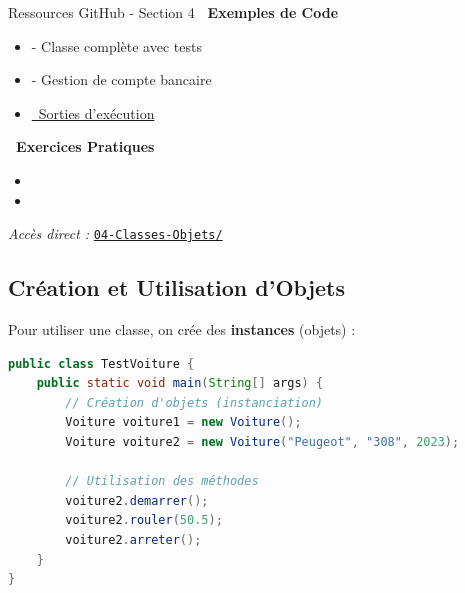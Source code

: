 \vspace{10pt}
\begin{githubbox}{Ressources GitHub - Section 4}
    \textbf{\faCode\ Exemples de Code}
    \begin{itemize}
        \item {} - Classe complète avec tests
        \item {} - Gestion de compte bancaire
        \item \href{\repourl/blob/main/04-Classes-Objets/exemples/screenshots/output-examples.txt}{\faTerminal\ Sorties d'exécution}
    \end{itemize}
    
    \vspace{5pt}
    
    \textbf{\faPencilAlt\ Exercices Pratiques}
    \begin{itemize}
        \item {}
        \item {}
    \end{itemize}
    
    \vspace{5pt}
    
    \textit{Accès direct :} \href{\repourl/tree/main/04-Classes-Objets}{\texttt{04-Classes-Objets/}}
\end{githubbox}


\subsection{Création et Utilisation d'Objets}

Pour utiliser une classe, on crée des \textbf{instances} (objets) :

\begin{lstlisting}[language=Java, caption=Utilisation de la classe Voiture]
public class TestVoiture {
    public static void main(String[] args) {
        // Création d'objets (instanciation)
        Voiture voiture1 = new Voiture();
        Voiture voiture2 = new Voiture("Peugeot", "308", 2023);
        
        // Utilisation des méthodes
        voiture2.demarrer();
        voiture2.rouler(50.5);
        voiture2.arreter();
    }
}
\end{lstlisting}

